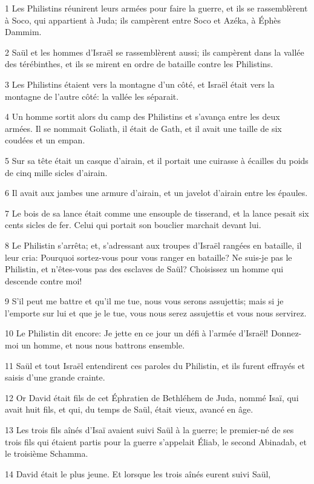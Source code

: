 \par 1 Les Philistins réunirent leurs armées pour faire la guerre, et ils se rassemblèrent à Soco, qui appartient à Juda; ils campèrent entre Soco et Azéka, à Éphès Dammim.
\par 2 Saül et les hommes d'Israël se rassemblèrent aussi; ils campèrent dans la vallée des térébinthes, et ils se mirent en ordre de bataille contre les Philistins.
\par 3 Les Philistins étaient vers la montagne d'un côté, et Israël était vers la montagne de l'autre côté: la vallée les séparait.
\par 4 Un homme sortit alors du camp des Philistins et s'avança entre les deux armées. Il se nommait Goliath, il était de Gath, et il avait une taille de six coudées et un empan.
\par 5 Sur sa tête était un casque d'airain, et il portait une cuirasse à écailles du poids de cinq mille sicles d'airain.
\par 6 Il avait aux jambes une armure d'airain, et un javelot d'airain entre les épaules.
\par 7 Le bois de sa lance était comme une ensouple de tisserand, et la lance pesait six cents sicles de fer. Celui qui portait son bouclier marchait devant lui.
\par 8 Le Philistin s'arrêta; et, s'adressant aux troupes d'Israël rangées en bataille, il leur cria: Pourquoi sortez-vous pour vous ranger en bataille? Ne suis-je pas le Philistin, et n'êtes-vous pas des esclaves de Saül? Choisissez un homme qui descende contre moi!
\par 9 S'il peut me battre et qu'il me tue, nous vous serons assujettis; mais si je l'emporte sur lui et que je le tue, vous nous serez assujettis et vous nous servirez.
\par 10 Le Philistin dit encore: Je jette en ce jour un défi à l'armée d'Israël! Donnez-moi un homme, et nous nous battrons ensemble.
\par 11 Saül et tout Israël entendirent ces paroles du Philistin, et ils furent effrayés et saisis d'une grande crainte.
\par 12 Or David était fils de cet Éphratien de Bethléhem de Juda, nommé Isaï, qui avait huit fils, et qui, du temps de Saül, était vieux, avancé en âge.
\par 13 Les trois fils aînés d'Isaï avaient suivi Saül à la guerre; le premier-né de ses trois fils qui étaient partis pour la guerre s'appelait Éliab, le second Abinadab, et le troisième Schamma.
\par 14 David était le plus jeune. Et lorsque les trois aînés eurent suivi Saül,
